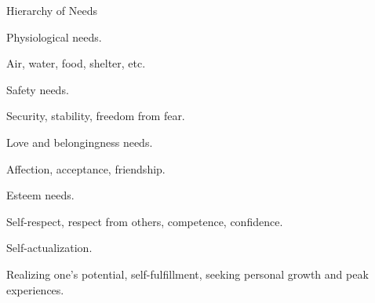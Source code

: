 \begin{coloredlist}
    \item Hierarchy of Needs
    \begin{coloredlist}
        \item Physiological needs.
        \begin{coloredlist}
            \item Air, water, food, shelter, etc.
        \end{coloredlist}
        \item Safety needs.
        \begin{coloredlist}
            \item Security, stability, freedom from fear.
        \end{coloredlist}
        \item Love and belongingness needs.
        \begin{coloredlist}
            \item Affection, acceptance, friendship.
        \end{coloredlist}
        \item Esteem needs.
        \begin{coloredlist}
            \item Self-respect, respect from others, competence, confidence.
        \end{coloredlist}
        \item Self-actualization.
        \begin{coloredlist}
            \item Realizing one's potential, self-fulfillment, seeking personal growth and peak experiences.
        \end{coloredlist}
    \end{coloredlist}
\end{coloredlist}

